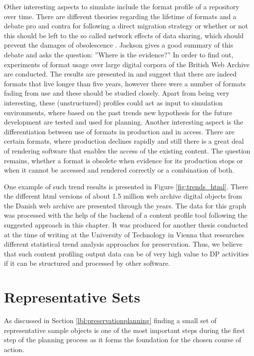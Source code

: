 Other interesting aspects to simulate include the format profile of a repository over time. There are different theories regarding the lifetime of formats and a debate pro and contra for following a direct migration strategy or whether or not this should be left to the so called network effects of data sharing, which should prevent the damages of obsolescence \cite{Rosenthal:1January2010:0737-8831:195}. Jackson gives a good summary of this debate and asks the question: ''Where is the evidence?'' In order to find out, experiments of format usage over large digital corpora of the British Web Archive are conducted. The results are presented in \cite{journals/corr/abs-1210-1714} and suggest that there are indeed formats that live longer than five years, however there were a number of formats fading from use and these should be studied closely. Apart from being very interesting, these (unstructured) profiles could act as input to simulation environments, where based on the past trends new hypothesis for the future development are tested and used for planning. Another interesting aspect is the differentiation between use of formats in production and in access. There are certain formats, where production declines rapidly and still there is a great deal of rendering software that enables the access of the existing content. The question remains, whether a format is obsolete when evidence for its production stops or when it cannot be accessed and rendered correctly or a combination of both.

One example of such trend results is presented in Figure \ref{fig:trends_html}. There the different html versions of about 1.5 million web archive digital objects from the Danish web archive are presented through the years. The data for this graph was processed with the help of the backend of a content profile tool following the suggested approach in this chapter. It was produced for another thesis conducted at the time of writing at the University of Technology in Vienna that researches different statistical trend analysis approaches for preservation. Thus, we believe that such content profiling output data can be of very high value to DP activities if it can be structured and processed by other software.


\section{Representative Sets}
\label{sec:representative_sets}
As discussed in Section \ref{lbl:preservationplanning} finding a small set of representative sample objects is one of the most important steps during the first step of the planning process as it forms the foundation for the chosen course of action.

